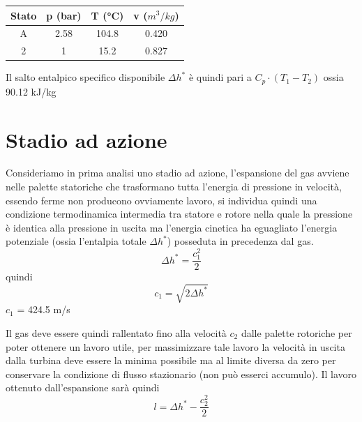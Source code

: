 \documentclass[a4paper,12pt]{article}
\begin{document}
\begin{center}
    \begin{tabular}{c|c|c|c}
        Stato   &p (bar)    &T (°C) &v ($m^3/kg$) \\ \hline
        A       &2.58       &104.8  &0.420  \\
        2       &1          &15.2   &0.827  
    \end{tabular}
\end{center}
Il salto entalpico specifico disponibile $\Delta h^*$ è quindi pari a $C_p \cdot (T_1-T_2)$ ossia 90.12 kJ/kg

\section{Stadio ad azione}
\label{sec:stadio_ad_azione}
Consideriamo in prima analisi uno stadio ad azione, l'espansione del gas avviene nelle palette statoriche che trasformano tutta l'energia di pressione in velocità,
essendo ferme non producono ovviamente lavoro, si individua quindi una condizione termodinamica intermedia tra statore e rotore nella quale la pressione è identica
alla pressione in uscita ma l'energia cinetica ha eguagliato l'energia potenziale (ossia l'entalpia totale $\Delta h^*$) posseduta in precedenza dal gas.
\begin{equation}
    \label{eq:entalpia_stadio_azione}
    \Delta h^* = \frac{c_1^2}{2}
\end{equation}
quindi
\begin{equation}
    \label{eq:vel_stadio_azione}
    c_1 = \sqrt{2\Delta h^*}    
\end{equation}
$c_1$ = 424.5 m/s

Il gas deve essere quindi rallentato fino alla velocità $c_2$ dalle palette rotoriche per poter ottenere un lavoro utile, per massimizzare tale lavoro la velocità
in uscita dalla turbina deve essere la minima possibile ma al limite diversa da zero per conservare la condizione di flusso stazionario (non può esserci accumulo).
Il lavoro ottenuto dall'espansione sarà quindi
\begin{equation}
    \label{eq:lavoro_ad_azione}
    l = \Delta h^* - \frac{c_2^2}{2}
\end{equation}
\end{document}
